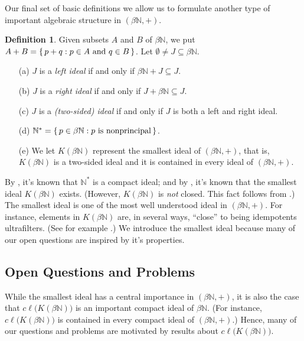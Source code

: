 \documentclass[12pt]{article}
\theoremstyle{plain}
\theoremstyle{definition}
\newtheorem{defn}[thm]{Definition}
\newcommand{\bbN}{\mathbb{N}}
\begin{document}
Our final set of basic definitions we allow us to formulate another type
of important algebraic structure in $(\beta\bbN, +)$. 
\begin{defn}
  Given subsets $A$ and $B$ of $\beta\bbN$, we put $A + B = \{\, p+q :
  \hbox{$p \in A$ and $q \in B$} \,\}$.
  Let $\emptyset \ne J \subseteq \beta\bbN$.
  \begin{itemize}
    \item[(a)] $J$ is a \textsl{left ideal} if and only if
      $\beta\bbN + J \subseteq J$.
    \item[(b)] $J$ is a \textsl{right ideal} if and only if
      $J+\beta\bbN \subseteq J$.
    \item[(c)] $J$ is a \textsl{(two-sided) ideal} if and only if
      $J$ is both a left and right ideal.
    \item[(d)] $\bbN^* = \{\, p \in \beta\bbN : \hbox{$p$ is
        nonprincipal} \,\}$.
    \item[(e)] We let $K(\beta\bbN)$ represent the smallest ideal of
      $(\beta\bbN, +)$, that is, $K(\beta\bbN)$ is a two-sided ideal
      and it is contained in every ideal of $(\beta\bbN, +)$.
  \end{itemize}
\end{defn}

By \cite[Theorem 4.36]{Hindman:1998fk}, it's known that $\bbN^*$ is a
compact ideal; and by \cite[Theorem 4.36]{Hindman:1998fk}, it's known
that the smallest ideal $K(\beta\bbN)$ exists. 
(However, $K(\beta\bbN)$ is \textsl{not} closed. 
This fact follows from \cite[Theorem 4.4]{Hindman:1996uq}.)
The smallest ideal is one of the most well understood ideal in
$(\beta\bbN, +)$.
For instance, elements in $K(\beta\bbN)$ are, in several ways,
``close'' to being idempotents ultrafilters. 
(See for example \cite[Theorems 4.39 and 4.43]{Hindman:1998fk}.)
We introduce the smallest ideal because many of our open questions are
inspired by it's properties. 

\subsection{Open Questions and Problems}
While the smallest ideal has a central importance in $(\beta\bbN, +)$,
it is also the case that $c\ell\bigl(K(\beta\bbN)\bigr)$ is an
important compact ideal of $\beta\bbN$.
(For instance, $c\ell\bigl(K(\beta\bbN)\bigr)$ is contained in every
compact ideal of $(\beta\bbN, +)$.)
Hence, many of our questions and problems are motivated by results
about $c\ell\bigl(K(\beta\bbN)\bigr)$.
\end{document}
